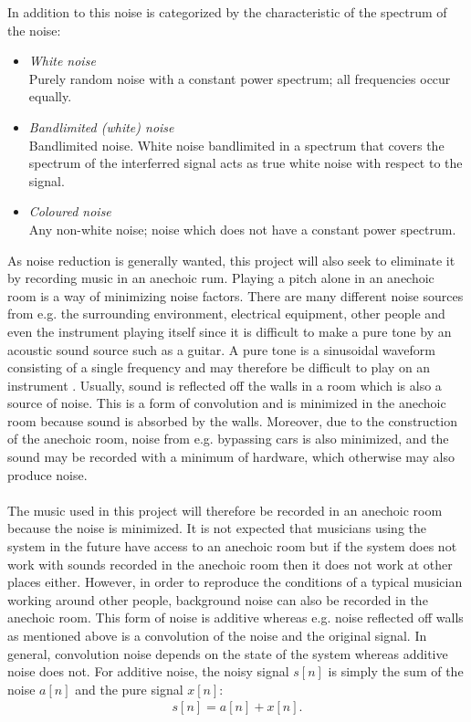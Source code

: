 In addition to this noise is categorized by the characteristic of the spectrum of the noise:
\begin{itemize}
\item \textit{White noise}\\
Purely random noise with a constant power spectrum; all frequencies occur equally.
\item \textit{Bandlimited (white) noise}\\
Bandlimited noise. White noise bandlimited in a spectrum that covers the spectrum of the interferred signal acts as true white noise with respect to the signal.
\item \textit{Coloured noise}\\
Any non-white noise; noise which does not have a constant power spectrum.
\end{itemize}

As noise reduction is generally wanted, this project will also seek to eliminate it by recording music in an anechoic rum. Playing a pitch alone in an anechoic room is a way of minimizing noise factors. There are many different noise sources from e.g. the surrounding environment, electrical equipment, other people and even the instrument playing itself since it is difficult to make a pure tone by an acoustic sound source such as a guitar. A pure tone is a sinusoidal waveform consisting of a single frequency and may therefore be difficult to play on an instrument \cite{AcousticNoise}. Usually, sound is reflected off the walls in a room which is also a source of noise. This is a form of convolution and is minimized in the anechoic room because sound is absorbed by the walls. Moreover, due to the construction of the anechoic room, noise from e.g. bypassing cars is also minimized, and the sound may be recorded with a minimum of hardware, which otherwise may also produce noise.
\\ \\
The music used in this project will therefore be recorded in an anechoic room because the noise is minimized. 
It is not expected that musicians using the system in the future have access to an anechoic room but if the system does not work with sounds recorded in the anechoic room then it does not work at other places either. However, in order to reproduce the conditions of a typical musician working around other people, background noise can also be recorded in the anechoic room. This form of noise is additive whereas e.g. noise reflected off walls as mentioned above is a convolution of the noise and the original signal. In general, convolution noise depends on the state of the system whereas additive noise does not. For additive noise, the noisy signal $s[n]$ is simply the sum of the noise $a[n]$ and the pure signal $x[n]$:
\begin{align*}
s[n] = a[n] + x[n].
\end{align*}

